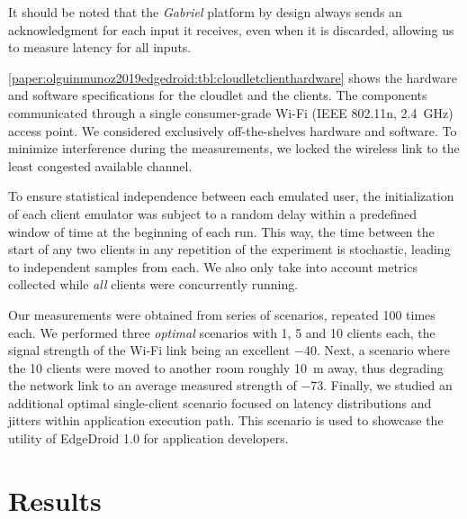 It should be noted that the \emph{Gabriel} platform by design always sends an acknowledgment for each input it receives, even when it is discarded, allowing us to measure latency for all inputs.


\cref{paper:olguinmunoz2019edgedroid:tbl:cloudletclienthardware} shows the hardware and software specifications for the cloudlet and the clients.
The components communicated through a single consumer-grade Wi-Fi (IEEE 802.11n, \SI{2.4}{\giga\hertz}) access point.
We considered exclusively off-the-shelves hardware and software.
To minimize interference during the measurements, we locked the wireless link to the least congested available channel.

To ensure statistical independence between each emulated user, the initialization of each client emulator was subject to a random delay within a predefined window of time at the beginning of each run.
This way, the time between the start of any two clients in any repetition of the experiment is stochastic, leading to independent samples from each.
We also only take into account metrics collected while \emph{all} clients were concurrently running.

Our measurements were obtained from series of scenarios, repeated 100 times each.
We performed three \emph{optimal} scenarios with 1, 5 and 10 clients each, the signal strength of the Wi-Fi link being an excellent \SI{-40}{\dBm}.
Next, a scenario where the 10 clients were moved to another room roughly \SI{10}{\meter} away, thus degrading the network link to an average measured strength of \SI{-73}{\dBm}.
Finally, we studied an additional optimal single-client scenario focused on latency distributions and jitters within application execution path.
This scenario is used to showcase the utility of EdgeDroid 1.0 for application developers.

\section{Results}\label{paper:olguinmunoz2019edgedroid:sec:results}

